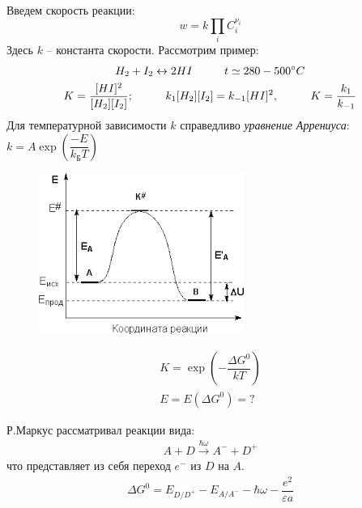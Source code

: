 \begin{lecture}
\begin{lecSection}
	Введем скорость реакции:
	\begin{equation}
		w = k \prod\limits_{i} C_i^{\nu_i}
		\label{eq:def_w_reaction}
	\end{equation}
	Здесь $ k $ -- константа скорости. Рассмотрим пример:
	\begin{gather*}
		H_2 + I_2 \leftrightarrow 2 HI \hspace*{1cm} t \simeq 280-500^\circ C \\
		K = \dfrac{[HI]^2}{[H_2] [I_2]}; \hspace*{1cm} k_1 [H_2] [I_2] = k_{-1} [HI]^2, \hspace*{1cm} K = \dfrac{k_1}{k_{-1}} \\
	\end{gather*}
	Для температурной зависимости $ k $ справедливо \textit{уравнение Аррениуса}: $ k = A \exp\left( \dfrac{-E}{k_\text{Б} T} \right) $
	\begin{figure}
		\centering\includegraphics[width=\linewidth]{lecture_03/arrenius}
	\end{figure}
	\begin{gather*}
	K = \exp\left( -\dfrac{\Delta G^0}{kT} \right) \\
	E = E (\Delta G^0) = ?
	\end{gather*}
	
	Р.Маркус рассматривал реакции вида:
	\begin{gather*}
		A + D \xrightarrow{\hbar \omega} A^{-} + D^{+}
	\end{gather*}
	что представляет из себя переход $ e^{-} $ из $ D $ на $ A $.
	\begin{gather}
		\Delta G^0 = E_{D/D^{+}} - E_{A/A^{-}} - \hbar \omega - \dfrac{e^2}{\varepsilon a}
	\end{gather}


\end{lecSection}
\end{lecture}
